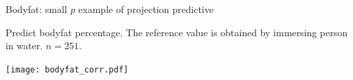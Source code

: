 \documentclass[t]{beamer}
\begin{document}
  


\begin{frame}{Bodyfat: small $p$ example of projection predictive}
  
  Predict bodyfat percentage. The reference value is obtained by
  immersing person in water. $n=251$.

  \pause
  \vspace{-0.7\baselineskip}
  \texttt{[image: bodyfat\_corr.pdf]}

\end{frame}
\end{document}
